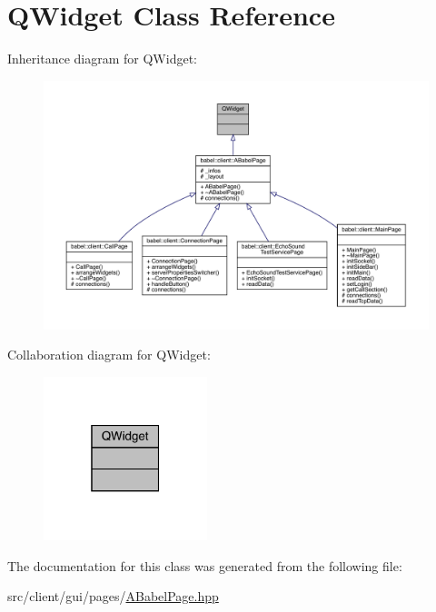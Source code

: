 \hypertarget{class_q_widget}{}\section{Q\+Widget Class Reference}
\label{class_q_widget}


Inheritance diagram for Q\+Widget\+:\nopagebreak
\begin{figure}[H]
\begin{center}
\leavevmode
\includegraphics[width=350pt]{class_q_widget__inherit__graph}
\end{center}
\end{figure}


Collaboration diagram for Q\+Widget\+:\nopagebreak
\begin{figure}[H]
\begin{center}
\leavevmode
\includegraphics[width=135pt]{class_q_widget__coll__graph}
\end{center}
\end{figure}


The documentation for this class was generated from the following file\+:\begin{DoxyCompactItemize}
\item 
src/client/gui/pages/\mbox{\hyperlink{_a_babel_page_8hpp}{A\+Babel\+Page.\+hpp}}\end{DoxyCompactItemize}

